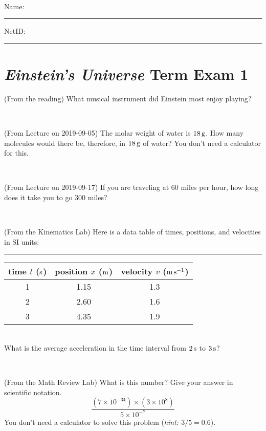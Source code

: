 \documentclass[12pt, letterpaper]{article}
\begin{document}
\vfill ~


\cleardoublepage



\noindent
Name: \rule[-1ex]{0.60\textwidth}{0.1pt}
NetID: \rule[-1ex]{0.20\textwidth}{0.1pt}

\section*{\textsl{Einstein's Universe} Term Exam 1}
\setcounter{problem}{1}


\begin{problem} (From the reading)
What musical instrument did Einstein most enjoy playing?
\end{problem}


\vfill ~

\begin{problem} (From Lecture on 2019-09-05)
The molar weight of water is $18\,\mathrm{g}$. How many molecules would there
be, therefore, in $18\,\mathrm{g}$ of water? You don't need a calculator for
this.
\end{problem}


\vfill ~

\begin{problem} (From Lecture on 2019-09-17)
If you are traveling at 60 miles per hour, how long does
it take you to go 300 miles?
\end{problem}


\vfill ~

\begin{problem} (From the Kinematics Lab)
Here is a data table of times, positions, and velocities in SI units:\\
\rule{1.0in}{0pt}\begin{tabular}{c|c|c}
time $t$ ($\mathrm{s}$) & position $x$ ($\mathrm{m}$) & velocity $v$ ($\mathrm{m}\,\mathrm{s}^{-1}$) \\
\hline
1 & 1.15 & 1.3 \\
2 & 2.60 & 1.6 \\
3 & 4.35 & 1.9 \\
\hline
\end{tabular}\\
What is the average acceleration in the time interval from $2\,\mathrm{s}$ to $3\,\mathrm{s}$?
\end{problem}


\vfill ~


\clearpage


\begin{problem} (From the Math Review Lab)
What is this number? Give your answer in scientific notation.
$$
\frac{(7\times10^{-34})\times(3\times10^8)}{5\times10^{-7}}
$$
You don't need a calculator to solve this problem (\textit{hint: $3/5=0.6$}).
\end{problem}
\end{document}
